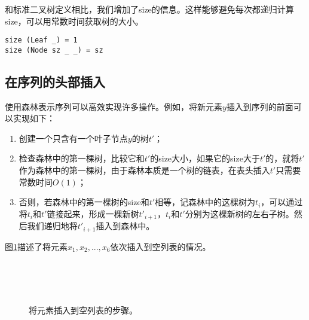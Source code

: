 \documentclass[UTF8]{article}
\begin{document}
和标准二叉树定义相比，我们增加了size的信息。这样能够避免每次都递归计算size，可以用常数时间获取树的大小。

\begin{lstlisting}[style=Haskell]
size (Leaf _) = 1
size (Node sz _ _) = sz
\end{lstlisting}

\subsection{在序列的头部插入}
使用森林表示序列可以高效实现许多操作。例如，将新元素$y$插入到序列的前面可以实现如下：

\begin{enumerate}
\item 创建一个只含有一个叶子节点$y$的树$t'$；
\item 检查森林中的第一棵树，比较它和$t'$的size大小，如果它的size大于$t'$的，就将$t'$作为森林中的第一棵树，由于森林本质是一个树的链表，在表头插入$t'$只需要常数时间$O(1)$；
\item 否则，若森林中的第一棵树的size和$t'$相等，记森林中的这棵树为$t_i$，可以通过将$t_i$和$t'$链接起来，形成一棵新树$t'_{i+1}$，$t_i$和$t'$分别为这棵新树的左右子树。然后我们递归地将$t'_{i+1}$插入到森林中。
\end{enumerate}

图\ref{fig:bralist-2}描述了将元素$x_1, x_2, ..., x_6$依次插入到空列表的情况。

\begin{figure}[htbp]
  \centering
   \\
   \\
   \\
  \caption{将元素插入到空列表的步骤。} \label{fig:bralist-2}
\end{figure}
\end{document}
